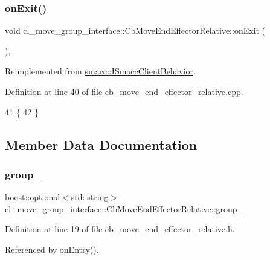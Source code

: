 \subsubsection{\texorpdfstring{on\+Exit()}{onExit()}}
{\footnotesize\ttfamily void cl\+\_\+move\+\_\+group\+\_\+interface\+::\+Cb\+Move\+End\+Effector\+Relative\+::on\+Exit (\begin{DoxyParamCaption}{ }\end{DoxyParamCaption})\hspace{0.3cm}{\ttfamily [override]}, {\ttfamily [virtual]}}



Reimplemented from \hyperlink{classsmacc_1_1ISmaccClientBehavior_ad1198fdb2cbdf11f3276d3e23d4c0a50}{smacc\+::\+I\+Smacc\+Client\+Behavior}.



Definition at line 40 of file cb\+\_\+move\+\_\+end\+\_\+effector\+\_\+relative.\+cpp.


\begin{DoxyCode}
41     \{
42     \}
\end{DoxyCode}


\subsection{Member Data Documentation}
\mbox{\label{classcl__move__group__interface_1_1CbMoveEndEffectorRelative_a1bb9caf9c715a5d10ea38ab46c297adb}} 
\subsubsection{\texorpdfstring{group\+\_\+}{group\_}}
{\footnotesize\ttfamily boost\+::optional$<$std\+::string$>$ cl\+\_\+move\+\_\+group\+\_\+interface\+::\+Cb\+Move\+End\+Effector\+Relative\+::group\+\_\+}



Definition at line 19 of file cb\+\_\+move\+\_\+end\+\_\+effector\+\_\+relative.\+h.



Referenced by on\+Entry().

